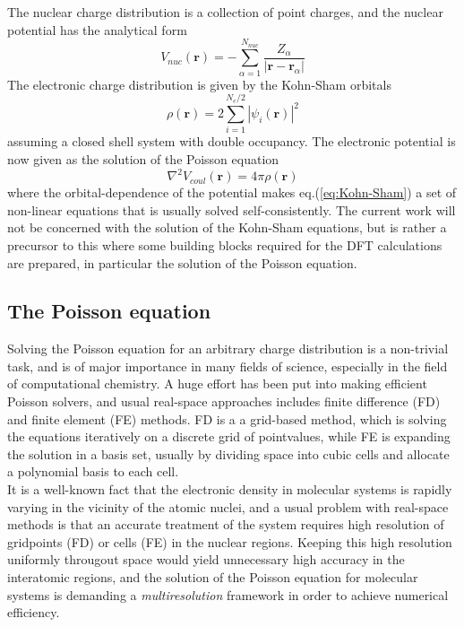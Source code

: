 \noindent
The nuclear charge distribution is a collection of point charges, and the 
nuclear potential has the analytical form
\begin{equation}
	V_{nuc}(\boldsymbol{r}) = -\sum_{\alpha=1}^{N_{nuc}}
	\frac{Z_{\alpha}}{|\boldsymbol{r}-\boldsymbol{r}_{\alpha}|}
\end{equation}
The electronic charge distribution is given by the Kohn-Sham orbitals
\begin{equation}
	\rho(\boldsymbol{r}) = 2\sum_{i=1}^{N_e/2} |\psi_i(\boldsymbol{r})|^2
\end{equation}
assuming a closed shell system with double occupancy. The electronic potential 
is now given as the solution of the Poisson equation
\begin{equation}
	\nabla^2 V_{coul}(\boldsymbol{r}) = 4\pi\rho(\boldsymbol{r})
\end{equation}
where the orbital-dependence of the potential makes eq.(\ref{eq:Kohn-Sham}) a set
of non-linear equations that is usually solved self-consistently. 
The current work will not be concerned with the solution of the Kohn-Sham
equations, but is rather a precursor to this where some building blocks
required for the DFT calculations are prepared, in particular the solution of 
the Poisson equation.

\subsection*{The Poisson equation}
Solving the Poisson equation for an arbitrary charge distribution is a 
non-trivial task, and is of major importance in many fields of science, 
especially in the field of computational chemistry. A huge effort has been put 
into making efficient Poisson solvers, and usual real-space approaches includes
finite difference (FD) and finite element (FE) methods. FD is a a grid-based
method, which is solving the equations iteratively on a discrete grid of 
pointvalues, while FE is expanding the solution in a basis set, usually by
dividing space into cubic cells and allocate a polynomial basis to each cell.\\

\noindent
It is a well-known fact that the electronic density in molecular systems
is rapidly varying in the vicinity of the atomic nuclei, and a usual problem
with real-space methods is that an accurate treatment of the system requires
high resolution of gridpoints (FD) or cells (FE) in the nuclear regions.
Keeping this high resolution uniformly througout space would yield unnecessary
high accuracy in the interatomic regions, and the solution of the Poisson
equation for molecular systems is demanding a \emph{multiresolution} framework 
in order to achieve numerical efficiency.\\

